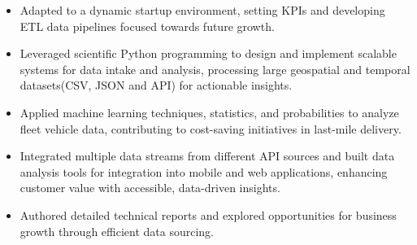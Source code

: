 \documentclass[10pt,a4paper,ragged2e,withhyper]{altacv}
\begin{document}


\begin{paracol}{2}


\begin{itemize}
    \item Adapted to a dynamic startup environment, setting KPIs and developing ETL data pipelines focused towards future growth.
    \item Leveraged scientific Python programming to design and implement scalable systems for data intake and analysis, processing large geospatial and temporal datasets(CSV, JSON and API) for actionable insights.
    \item Applied machine learning techniques, statistics, and probabilities to analyze fleet vehicle data, contributing to cost-saving initiatives in last-mile delivery.
    \item Integrated multiple data streams from different API sources and built data analysis tools for integration into mobile and web applications, enhancing customer value with accessible, data-driven insights.
    \item Authored detailed technical reports and explored opportunities for business growth through efficient data sourcing.
\end{itemize}


\end{paracol}
\end{document}
